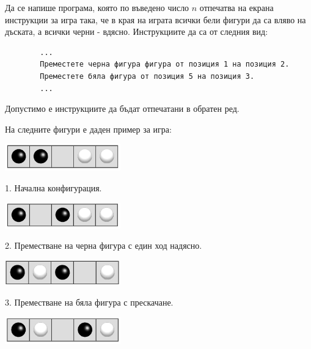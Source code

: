 {\begin{enumerate}[resume]
	Да се напише програма, която по въведено число $n$ отпечатва на екрана инструкции за игра така, че в края на играта всички бели фигури да са вляво на дъската, а всички черни - вдясно. Инструкциите да са от следния вид:

	\begin{verbatim}
		...
		Преместете черна фигура фигура от позиция 1 на позиция 2.
		Преместете бяла фигура от позиция 5 на позиция 3.
		...
	\end{verbatim}

	Допустимо е инструкциите да бъдат отпечатани в обратен ред.


	\begin{mdframed}[hidealllines=true,backgroundcolor=gray!20]

		На следните фигури е даден пример за игра:

		\begin{flushleft}
		\includegraphics[width=5cm]{images/step0}

		1. Начална конфигурация.
		\end{flushleft}


		\begin{flushleft}
		\includegraphics[width=5cm]{images/step1}

		\relscale{0.8}
		2. Преместване на черна фигура с един ход надясно.
		\end{flushleft}

		\begin{flushleft}
		\includegraphics[width=5cm]{images/step2}

		3. Преместване на бяла фигура с прескачане.
		\end{flushleft}

		\begin{flushleft}
		\includegraphics[width=5cm]{images/step3}


\end{flushleft}
\end{mdframed}
\end{enumerate}}
